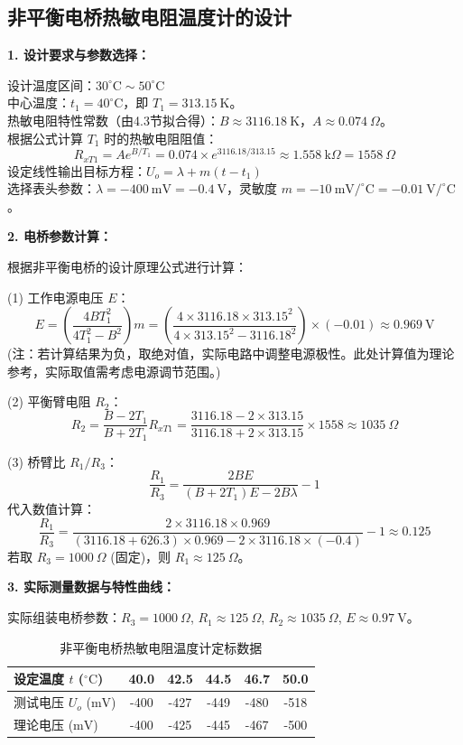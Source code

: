 \documentclass[11pt]{article}
\begin{document}
\subsection{非平衡电桥热敏电阻温度计的设计}

\noindent
\textbf{1. 设计要求与参数选择：}

\noindent
设计温度区间：$30^\circ\mathrm{C} \sim 50^\circ\mathrm{C}$ \\
中心温度：$t_1 = 40^\circ\mathrm{C}$，即 $T_1 = 313.15\ \mathrm{K}$。 \\
热敏电阻特性常数（由4.3节拟合得）：$B \approx 3116.18\ \mathrm{K}$，$A \approx 0.074\ \Omega$。 \\
根据公式计算 $T_1$ 时的热敏电阻阻值：
\[
R_{xT1} = A e^{B/T_1} = 0.074 \times e^{3116.18/313.15} \approx 1.558\ \mathrm{k}\Omega = 1558\ \Omega
\]
设定线性输出目标方程：$U_o = \lambda + m(t - t_1)$ \\
选择表头参数：$\lambda = -400\ \mathrm{mV} = -0.4\ \mathrm{V}$，灵敏度 $m = -10\ \mathrm{mV}/^\circ\mathrm{C} = -0.01\ \mathrm{V}/^\circ\mathrm{C}$。

\vspace{1em}
\noindent
\textbf{2. 电桥参数计算：}

根据非平衡电桥的设计原理公式进行计算：

\noindent
(1) 工作电源电压 $E$：
\[
E = \left( \frac{4BT_1^2}{4T_1^2 - B^2} \right) m = \left( \frac{4 \times 3116.18 \times 313.15^2}{4 \times 313.15^2 - 3116.18^2} \right) \times (-0.01) \approx 0.969\ \mathrm{V}
\]
(注：若计算结果为负，取绝对值，实际电路中调整电源极性。此处计算值为理论参考，实际取值需考虑电源调节范围。)

\noindent
(2) 平衡臂电阻 $R_2$：
\[
R_2 = \frac{B - 2T_1}{B + 2T_1} R_{xT1} = \frac{3116.18 - 2 \times 313.15}{3116.18 + 2 \times 313.15} \times 1558 \approx 1035\ \Omega
\]

\noindent
(3) 桥臂比 $R_1/R_3$：
\[
\frac{R_1}{R_3} = \frac{2BE}{(B + 2T_1)E - 2B\lambda} - 1
\]
代入数值计算：
\[
\frac{R_1}{R_3} = \frac{2 \times 3116.18 \times 0.969}{(3116.18 + 626.3) \times 0.969 - 2 \times 3116.18 \times (-0.4)} - 1 \approx 0.125
\]
若取 $R_3 = 1000\ \Omega$ (固定)，则 $R_1 \approx 125\ \Omega$。

\vspace{1em}
\noindent
\textbf{3. 实际测量数据与特性曲线：}

\noindent
实际组装电桥参数：$R_3 = 1000\ \Omega$, $R_1 \approx 125\ \Omega$, $R_2 \approx 1035\ \Omega$, $E \approx 0.97\ \mathrm{V}$。

\begin{table}[h]
    \centering
    \caption{非平衡电桥热敏电阻温度计定标数据}
    \begin{tabular}{lccccc}
        \toprule
        设定温度 $t$ ($^\circ\mathrm{C}$) & 40.0 & 42.5 & 44.5 & 46.7 & 50.0 \\
        \midrule
        测试电压 $U_o$ ($\mathrm{mV}$) & -400 & -427 & -449 & -480 & -518 \\
        理论电压 ($\mathrm{mV}$) & -400 & -425 & -445 & -467 & -500 \\
        \bottomrule
    \end{tabular}
\end{table}
\end{document}
